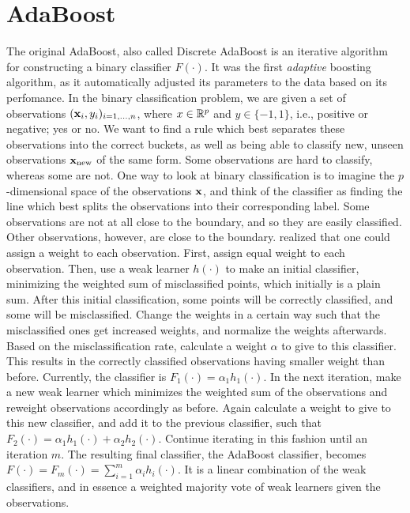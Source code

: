 \section{AdaBoost}
The original AdaBoost, also called Discrete AdaBoost \citep{adaboost} is an iterative algorithm for constructing a binary classifier $F(\cdot)$. It was the first \textit{adaptive} boosting algorithm, as it automatically adjusted its parameters to the data based on its perfomance. In the binary classification problem, we are given a set of observations $(\mathbf{x}_i,y_i)_{i=1,\ldots,n}$, where $x\in\mathbb{R}^p$ and $y\in\{-1,1\}$, i.e., positive or negative; yes or no. We want to find a rule which best separates these observations into the correct buckets, as well as being able to classify new, unseen observations $\mathbf{x}_{\text{new}}$ of the same form. Some observations are hard to classify, whereas some are not. One way to look at binary classification is to imagine the $p$-dimensional space of the observations $\mathbf{x}$, and think of the classifier as finding the line which best splits the observations into their corresponding label. Some observations are not at all close to the boundary, and so they are easily classified. Other observations, however, are close to the boundary. \citet{adaboost} realized that one could assign a weight to each observation. First, assign equal weight to each observation. Then, use a weak learner $h(\cdot)$ to make an initial classifier, minimizing the weighted sum of misclassified points, which initially is a plain sum. After this initial classification, some points will be correctly classified, and some will be misclassified. Change the weights in a certain way such that the misclassified ones get increased weights, and normalize the weights afterwards. Based on the misclassification rate, calculate a weight $\alpha$ to give to this classifier. This results in the correctly classified observations having smaller weight than before. Currently, the classifier is $F_1(\cdot)=\alpha_1h_1(\cdot).$ In the next iteration, make a new weak learner which minimizes the weighted sum of the observations and reweight observations accordingly as before. Again calculate a weight to give to this new classifier, and add it to the previous classifier, such that $F_2(\cdot)=\alpha_1h_1(\cdot)+\alpha_2h_2(\cdot)$. Continue iterating in this fashion until an iteration $m$. The resulting final classifier, the AdaBoost classifier, becomes $F(\cdot)=F_m(\cdot)=\sum_{i=1}^m\alpha_ih_i(\cdot)$. It is a linear combination of the weak classifiers, and in essence a weighted majority vote of weak learners given the observations.

